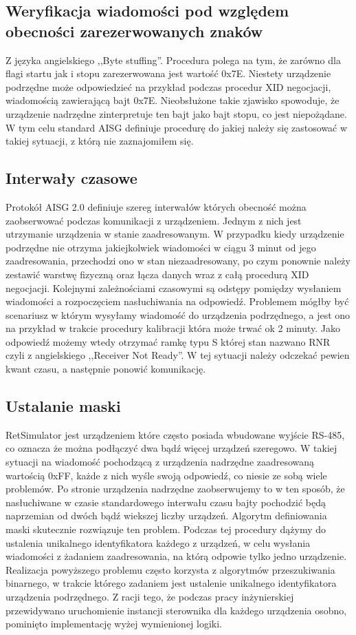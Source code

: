\subsection{Weryfikacja wiadomości pod względem obecności zarezerwowanych znaków}
    Z języka angielskiego ,,Byte stuffing''. Procedura polega na tym, że zarówno dla flagi startu jak i stopu zarezerwowana jest wartość 0x7E.
    Niestety urządzenie podrzędne może odpowiedzieć na przykład podczas procedur XID negocjacji, wiadomością zawierającą bajt 0x7E. Nieobsłużone
    takie zjawisko spowoduje, że urządzenie nadrzędne zinterpretuje ten bajt jako bajt stopu, co jest niepożądane. W tym celu standard AISG 
    definiuje procedurę do jakiej należy się zastosować w takiej sytuacji, z którą nie zaznajomiłem się.
\subsection{Interwały czasowe}
    Protokół AISG 2.0 definiuje szereg interwałów których obecność można zaobserwować podczas komunikacji z urządzeniem. Jednym z nich jest
    utrzymanie urządzenia w stanie zaadresowanym. W przypadku kiedy urządzenie podrzędne nie otrzyma jakiejkolwiek wiadomości w ciągu 3 minut
    od jego zaadresowania, przechodzi ono w stan niezaadresowany, po czym ponownie należy zestawić warstwę fizyczną oraz łącza danych wraz
    z całą procedurą XID negocjacji. Kolejnymi zależnościami czasowymi są odstępy pomiędzy wysłaniem wiadomości a rozpoczęciem nasłuchiwania na odpowiedź.
    Problemem mógłby być scenariusz w którym wysyłamy wiadomość do urządzenia podrzędnego, a jest ono na przykład w trakcie procedury kalibracji która może 
    trwać ok 2 minuty. Jako odpowiedź możemy wtedy otrzymać ramkę typu S której stan nazwano RNR czyli z angielskiego ,,Receiver Not Ready''. 
    W tej sytuacji należy odczekać pewien kwant czasu, a następnie ponowić komunikację.
\subsection{Ustalanie maski}
    RetSimulator jest urządzeniem które często posiada wbudowane wyjście RS-485, co oznacza że można podłączyć dwa bądź więcej urządzeń szeregowo. 
    W takiej sytuacji na wiadomość pochodzącą z urządzenia nadrzędne zaadresowaną wartością 0xFF, każde z nich wyśle swoją odpowiedź, co niesie ze sobą wiele problemów.
    Po stronie urządzenia nadrzędne zaobserwujemy to w ten sposób, że nasłuchiwane w czasie standardowego interwału czasu bajty
    pochodzić będą naprzemian od dwóch bądź wiekszej liczby urządzeń. Algorytm definiowania maski skutecznie rozwiązuje ten problem. 
    Podczas tej procedury dążymy do ustalenia unikalnego identyfikatora każdego z urządzeń, w celu wysłania wiadomości z żadaniem zaadresowania,
    na którą odpowie tylko jedno urządzenie. Realizacja powyższego problemu często korzysta z algorytmów przeszukiwania binarnego, w trakcie którego
    zadaniem jest ustalenie unikalnego identyfikatora urządzenia podrzędnego. Z racji tego, że podczas pracy inżynierskiej
    przewidywano uruchomienie instancji sterownika dla każdego urządzenia osobno, pominięto implementację wyżej wymienionej logiki.
